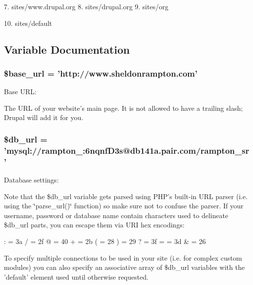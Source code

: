 7. sites/www.drupal.org 8. sites/drupal.org 9. sites/org

10. sites/default 

\subsection{Variable Documentation}
\hypertarget{sheldonrampton_8com_2settings_8php_6886427c9c643f707fcb35c018049bc7}{
\subsubsection[{\$base\_\-url}]{\setlength{\rightskip}{0pt plus 5cm}\$base\_\-url = 'http://www.sheldonrampton.com'}}
\label{sheldonrampton_8com_2settings_8php_6886427c9c643f707fcb35c018049bc7}


Base URL:

The URL of your website's main page. It is not allowed to have a trailing slash; Drupal will add it for you. \hypertarget{sheldonrampton_8com_2settings_8php_01f60cfc6d59f1f30585ac6b516d739b}{
\subsubsection[{\$db\_\-url}]{\setlength{\rightskip}{0pt plus 5cm}\$db\_\-url = 'mysql://rampton\_:6nqnfD3s@db141a.pair.com/rampton\_\-sr'}}
\label{sheldonrampton_8com_2settings_8php_01f60cfc6d59f1f30585ac6b516d739b}


Database settings:

Note that the \$db\_\-url variable gets parsed using PHP's built-in URL parser (i.e. using the \char`\"{}parse\_\-url()\char`\"{} function) so make sure not to confuse the parser. If your username, password or database name contain characters used to delineate \$db\_\-url parts, you can escape them via URI hex encodings:

: = 3a / = 2f @ = 40 + = 2b ( = 28 ) = 29 ? = 3f = = 3d \& = 26

To specify multiple connections to be used in your site (i.e. for complex custom modules) you can also specify an associative array of \$db\_\-url variables with the 'default' element used until otherwise requested.

